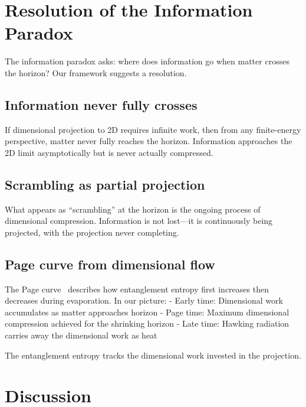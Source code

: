 \documentclass[aps,prd,twocolumn,superscriptaddress,floatfix]{revtex4-2}
\begin{document}
\section{Resolution of the Information Paradox}

The information paradox asks: where does information go when matter crosses the horizon? Our framework suggests a resolution.

\subsection{Information never fully crosses}

If dimensional projection to 2D requires infinite work, then from any finite-energy perspective, matter never fully reaches the horizon. Information approaches the 2D limit asymptotically but is never actually compressed.

\subsection{Scrambling as partial projection}

What appears as ``scrambling'' at the horizon is the ongoing process of dimensional compression. Information is not lost---it is continuously being projected, with the projection never completing.

\subsection{Page curve from dimensional flow}

The Page curve~\cite{page1993} describes how entanglement entropy first increases then decreases during evaporation. In our picture:
- Early time: Dimensional work accumulates as matter approaches horizon
- Page time: Maximum dimensional compression achieved for the shrinking horizon
- Late time: Hawking radiation carries away the dimensional work as heat

The entanglement entropy tracks the dimensional work invested in the projection.

\section{Discussion}
\end{document}
